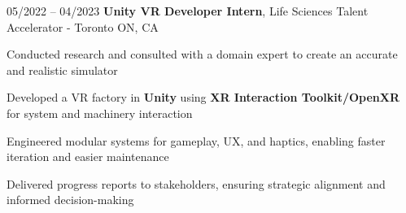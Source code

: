 \begin{twocolentry}{
    05/2022 – 04/2023
}
\fontsize{11 pt}{11 pt}\textbf{Unity VR Developer Intern}, Life Sciences Talent Accelerator - Toronto ON, CA\end{twocolentry}

\vspace{0.10 cm}
\begin{onecolentry}
    \begin{highlights}
        \item Conducted research and consulted with a domain expert to create an accurate and realistic simulator
        \item Developed a VR factory in \textbf{Unity} using \textbf{XR Interaction Toolkit/OpenXR} for system and machinery interaction
        \item Engineered modular systems for gameplay, UX, and haptics, enabling faster iteration and easier maintenance
        \item Delivered progress reports to stakeholders, ensuring strategic alignment and informed decision-making
    \end{highlights}
\end{onecolentry}

 